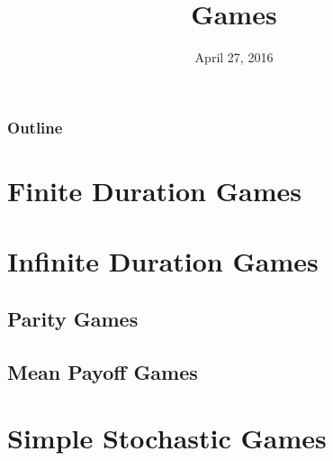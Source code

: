 \documentclass{beamer}
\title{Games}
\date{April 27, 2016}
\begin{document}
  \frame{\titlepage}

  \begin{frame}
    \frametitle{Outline}
    \tableofcontents
  \end{frame}

  \section{Finite Duration Games}
  \section{Infinite Duration Games}
      \subsection{Parity Games}
      \subsection{Mean Payoff Games}
  \section{Simple Stochastic Games}
\end{document}
